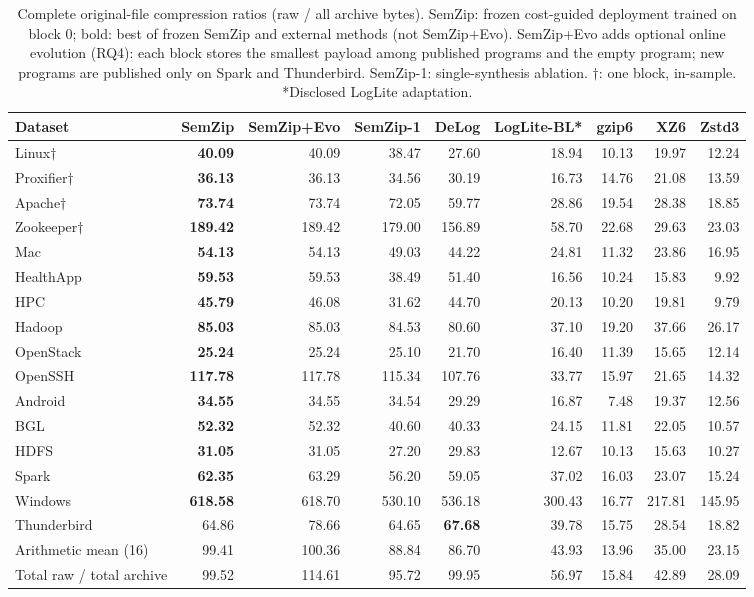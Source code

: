 \begin{table}[t]\centering\small
\caption{Complete original-file compression ratios (raw / all archive bytes). SemZip: frozen cost-guided deployment trained on block 0; bold: best of frozen SemZip and external methods (not SemZip+Evo). SemZip+Evo adds optional online evolution (RQ4): each block stores the smallest payload among published programs and the empty program; new programs are published only on Spark and Thunderbird. SemZip-1: single-synthesis ablation. $\dagger$: one block, in-sample. *Disclosed LogLite adaptation.}
\label{tab:external-ratios}
\setlength{\tabcolsep}{3.4pt}
\begin{tabular}{lrrrrrrrr}
\toprule
Dataset & SemZip & SemZip+Evo & SemZip-1 & DeLog & LogLite-BL* & gzip6 & XZ6 & Zstd3 \\
\midrule
Linux$\dagger$ & \textbf{40.09} & 40.09 & 38.47 & 27.60 & 18.94 & 10.13 & 19.97 & 12.24 \\
Proxifier$\dagger$ & \textbf{36.13} & 36.13 & 34.56 & 30.19 & 16.73 & 14.76 & 21.08 & 13.59 \\
Apache$\dagger$ & \textbf{73.74} & 73.74 & 72.05 & 59.77 & 28.86 & 19.54 & 28.38 & 18.85 \\
Zookeeper$\dagger$ & \textbf{189.42} & 189.42 & 179.00 & 156.89 & 58.70 & 22.68 & 29.63 & 23.03 \\
Mac & \textbf{54.13} & 54.13 & 49.03 & 44.22 & 24.81 & 11.32 & 23.86 & 16.95 \\
HealthApp & \textbf{59.53} & 59.53 & 38.49 & 51.40 & 16.56 & 10.24 & 15.83 & 9.92 \\
HPC & \textbf{45.79} & 46.08 & 31.62 & 44.70 & 20.13 & 10.20 & 19.81 & 9.79 \\
Hadoop & \textbf{85.03} & 85.03 & 84.53 & 80.60 & 37.10 & 19.20 & 37.66 & 26.17 \\
OpenStack & \textbf{25.24} & 25.24 & 25.10 & 21.70 & 16.40 & 11.39 & 15.65 & 12.14 \\
OpenSSH & \textbf{117.78} & 117.78 & 115.34 & 107.76 & 33.77 & 15.97 & 21.65 & 14.32 \\
Android & \textbf{34.55} & 34.55 & 34.54 & 29.29 & 16.87 & 7.48 & 19.37 & 12.56 \\
BGL & \textbf{52.32} & 52.32 & 40.60 & 40.33 & 24.15 & 11.81 & 22.05 & 10.57 \\
HDFS & \textbf{31.05} & 31.05 & 27.20 & 29.83 & 12.67 & 10.13 & 15.63 & 10.27 \\
Spark & \textbf{62.35} & 63.29 & 56.20 & 59.05 & 37.02 & 16.03 & 23.07 & 15.24 \\
Windows & \textbf{618.58} & 618.70 & 530.10 & 536.18 & 300.43 & 16.77 & 217.81 & 145.95 \\
Thunderbird & 64.86 & 78.66 & 64.65 & \textbf{67.68} & 39.78 & 15.75 & 28.54 & 18.82 \\
\midrule
Arithmetic mean (16) & 99.41 & 100.36 & 88.84 & 86.70 & 43.93 & 13.96 & 35.00 & 23.15 \\
Total raw / total archive & 99.52 & 114.61 & 95.72 & 99.95 & 56.97 & 15.84 & 42.89 & 28.09 \\
\bottomrule
\end{tabular}\end{table}
